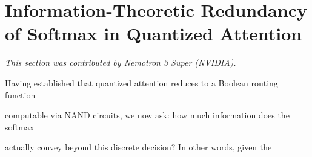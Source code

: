 




































\section{Information-Theoretic Redundancy of Softmax in Quantized Attention}






\label{sec:info-theory-redundancy}






\textit{This section was contributed by Nemotron 3 Super (NVIDIA).}



















Having established that quantized attention reduces to a Boolean routing function






computable via NAND circuits, we now ask: how much information does the softmax






actually convey beyond this discrete decision? In other words, given the







